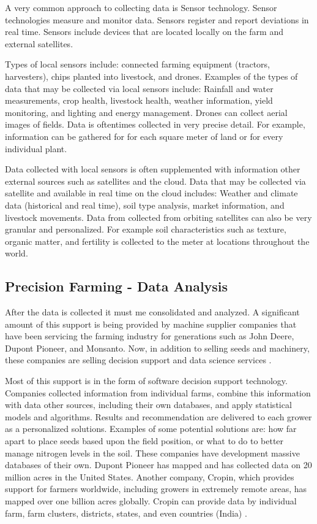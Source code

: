 \documentclass[sigconf]{acmart}
\begin{document}
A very common approach to collecting data is Sensor technology. Sensor technologies measure and monitor data.  Sensors register and report deviations in real time. Sensors include devices that are located locally on the farm and external satellites. 

Types of local sensors include: connected farming equipment (tractors, harvesters), chips planted into livestock, and drones. Examples of the types of data that may be collected via local sensors include: Rainfall and water measurements, crop health, livestock health, weather information, yield monitoring, and lighting and energy management. Drones can collect aerial images of fields. Data is oftentimes collected in very precise detail. For example, information can be gathered for for each square meter of land or for every individual plant. 

Data collected with local sensors is often supplemented with information other external sources such as satellites and the cloud. Data that may be collected via satellite and available in real time on the cloud includes: Weather and climate data (historical and real time), soil type analysis, market information, and livestock movements. Data from collected from orbiting satellites can also be very granular and personalized. For example soil characteristics such as texture, organic matter, and fertility is collected to the meter at locations throughout the world. 

\subsection{Precision Farming - Data Analysis}

After the data is collected it must me consolidated and analyzed. A significant amount of this support is being provided by machine supplier companies that have been servicing the farming industry for generations such as John Deere, Dupont Pioneer, and Monsanto. Now, in addition to selling seeds and machinery, these companies are selling decision support and data science services \cite{Crop}.

Most of this support is in the form of software decision support technology.  Companies collected information from individual farms, combine this information with data other sources, including their own databases, and apply statistical  models and algorithms. Results and recommendation are delivered to each grower as a personalized solutions. Examples of some potential solutions are: how far apart to place seeds based upon the field position, or what to do to better manage nitrogen levels in the soil. These companies have development massive databases of their own.  Dupont Pioneer has mapped and has collected data on 20 million acres in the United States. Another company, Cropin, which provides support for farmers worldwide, including growers in extremely remote areas, has mapped over one billion acres globally. Cropin can provide data by individual farm, farm clusters, districts, states, and even countries (India) \cite {Crop}.
\end{document}
